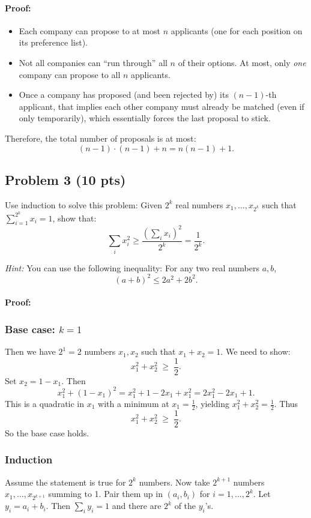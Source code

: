 \documentclass[12pt]{article}
\begin{document}
\paragraph{Proof:}
\begin{itemize}
    \item Each company can propose to at most $n$ applicants (one for each position on its preference list).
    \item Not all companies can ``run through'' all $n$ of their options. At most, only \emph{one} company can propose to all $n$ applicants.
    \item Once a company has proposed (and been rejected by) its $(n-1)$-th applicant, that implies each other company must already be matched (even if only temporarily), which essentially forces the last proposal to stick.
\end{itemize}
Therefore, the total number of proposals is at most:
\[
(n-1) \cdot (n-1) + n = n(n-1) + 1.
\]

\subsection*{Problem 3 (10 pts)}

Use induction to solve this problem: Given $2^k$ real numbers $x_1, \ldots, x_{2^k}$ such that $\sum_{i=1}^{2^k} x_i = 1$, show that:
\[
\sum_{i} x_i^2 \geq \frac{\left(\sum_{i} x_i\right)^2}{2^k} = \frac{1}{2^k}.
\]

\textit{Hint:} You can use the following inequality: For any two real numbers $a, b$, 
\[
(a+b)^2 \leq 2a^2 + 2b^2.
\]

\paragraph{Proof:}

\subsubsection*{Base case: $k=1$}
Then we have $2^1 = 2$ numbers $x_1, x_2$ such that $x_1 + x_2 = 1$. We need to show:
\[
x_1^2 + x_2^2 \;\ge\; \frac{1}{2}.
\]
Set $x_2 = 1 - x_1$. Then
\[
x_1^2 + (1 - x_1)^2 = x_1^2 + 1 - 2x_1 + x_1^2 = 2x_1^2 - 2x_1 + 1.
\]
This is a quadratic in $x_1$ with a minimum at $x_1 = \tfrac12$, yielding $x_1^2 + x_2^2 = \tfrac12$. Thus 
\[
x_1^2 + x_2^2 \;\ge\; \frac12.
\]
So the base case holds.

\subsubsection*{Induction}
Assume the statement is true for $2^k$ numbers. Now take $2^{k+1}$ numbers $x_1,\dots, x_{2^{k+1}}$ summing to 1. Pair them up in $(a_i,b_i)$ for $i=1,\ldots, 2^k$. Let $y_i = a_i + b_i$. Then $\sum_i y_i = 1$ and there are $2^k$ of the $y_i$'s.
\end{document}
